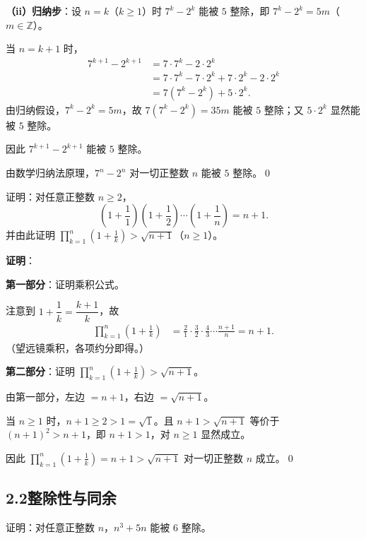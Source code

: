 \documentclass[12pt, a4paper]{ctexart}
\begin{document}
\textbf{（ii）归纳步}：设 $n = k$（$k \geq 1$）时 $7^k - 2^k$ 能被 $5$ 整除，即 $7^k - 2^k = 5m$（$m \in \mathbb{Z}$）。

当 $n = k+1$ 时，
\begin{align*}
7^{k+1} - 2^{k+1} &= 7 \cdot 7^k - 2 \cdot 2^k \\
&= 7 \cdot 7^k - 7 \cdot 2^k + 7 \cdot 2^k - 2 \cdot 2^k \\
&= 7(7^k - 2^k) + 5 \cdot 2^k.
\end{align*}
由归纳假设，$7^k - 2^k = 5m$，故 $7(7^k - 2^k) = 35m$ 能被 $5$ 整除；又 $5 \cdot 2^k$ 显然能被 $5$ 整除。

因此 $7^{k+1} - 2^{k+1}$ 能被 $5$ 整除。

由数学归纳法原理，$7^n - 2^n$ 对一切正整数 $n$ 能被 $5$ 整除。\qed

\begin{examplebox}[【例题3】证明不等式]
证明：对任意正整数 $n \geq 2$，
\[ \left(1 + \frac{1}{1}\right)\left(1 + \frac{1}{2}\right) \cdots \left(1 + \frac{1}{n}\right) = n + 1. \]
并由此证明 $\displaystyle\prod_{k=1}^{n}\left(1 + \frac{1}{k}\right) > \sqrt{n+1}$（$n \geq 1$）。
\end{examplebox}

\textbf{证明}：

\textbf{第一部分}：证明乘积公式。

注意到 $1 + \dfrac{1}{k} = \dfrac{k+1}{k}$，故
\begin{align*}
\prod_{k=1}^{n}\left(1 + \frac{1}{k}\right) &= \frac{2}{1} \cdot \frac{3}{2} \cdot \frac{4}{3} \cdots \frac{n+1}{n} = n + 1.
\end{align*}
（望远镜乘积，各项约分即得。）

\textbf{第二部分}：证明 $\displaystyle\prod_{k=1}^{n}\left(1 + \frac{1}{k}\right) > \sqrt{n+1}$。

由第一部分，左边 $= n+1$，右边 $= \sqrt{n+1}$。

当 $n \geq 1$ 时，$n + 1 \geq 2 > 1 = \sqrt{1}$。且 $n+1 > \sqrt{n+1}$ 等价于 $(n+1)^2 > n+1$，即 $n+1 > 1$，对 $n \geq 1$ 显然成立。

因此 $\displaystyle\prod_{k=1}^{n}\left(1 + \frac{1}{k}\right) = n + 1 > \sqrt{n+1}$ 对一切正整数 $n$ 成立。\qed

\subsection*{2.2\quad 整除性与同余}

\begin{examplebox}[【例题4】证明整除性]
证明：对任意正整数 $n$，$n^3 + 5n$ 能被 $6$ 整除。
\end{examplebox}
\end{document}
